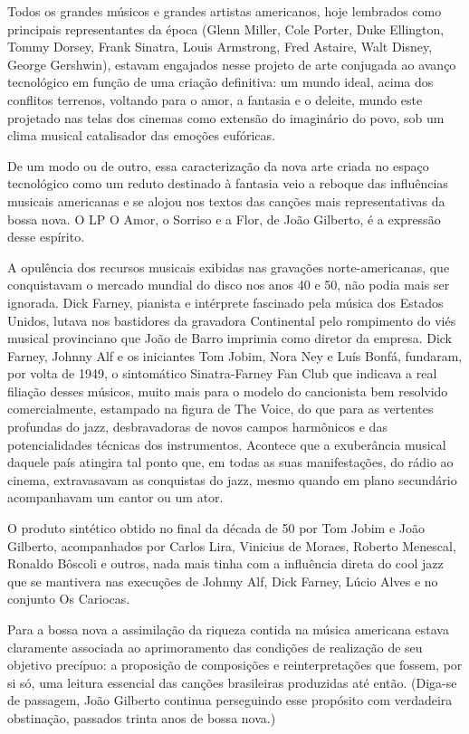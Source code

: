 Todos os grandes músicos e grandes artistas americanos, hoje lembrados
como principais representantes da época (Glenn Miller, Cole Porter, Duke
Ellington, Tommy Dorsey, Frank Sinatra, Louis Armstrong, Fred Astaire,
Walt Disney, George Gershwin), estavam engajados nesse projeto de arte
conjugada ao avanço tecnológico em função de uma criação definitiva: um
mundo ideal, acima dos conflitos terrenos, voltando para o amor, a
fantasia e o deleite, mundo este projetado nas telas dos cinemas como
extensão do imaginário do povo, sob um clima musical catalisador das
emoções eufóricas.~

De um modo ou de outro, essa caracterização da nova arte criada no
espaço tecnológico como um reduto destinado à fantasia veio a reboque
das influências musicais americanas e se alojou nos textos das canções
mais representativas da bossa nova. O LP O Amor, o Sorriso e a Flor, de
João Gilberto, é a expressão desse espírito.~

A opulência dos recursos musicais exibidas nas gravações
norte-americanas, que conquistavam o mercado mundial do disco nos anos
40 e 50, não podia mais ser ignorada. Dick Farney, pianista e intérprete
fascinado pela música dos Estados Unidos, lutava nos bastidores da
gravadora Continental pelo rompimento do viés musical provinciano que
João de Barro imprimia como diretor da empresa. Dick Farney, Johnny Alf
e os iniciantes Tom Jobim, Nora Ney e Luís Bonfá, fundaram, por volta de
1949, o sintomático Sinatra-Farney Fan Club que indicava a real filiação
desses músicos, muito mais para o modelo do cancionista bem resolvido
comercialmente, estampado na figura de The Voice, do que para as
vertentes profundas do jazz, desbravadoras de novos campos harmônicos e
das potencialidades técnicas dos instrumentos. Acontece que a
exuberância musical daquele país atingira tal ponto que, em todas as
suas manifestações, do rádio ao cinema, extravasavam as conquistas do
jazz, mesmo quando em plano secundário acompanhavam um cantor ou um
ator.~

O produto sintético obtido no final da década de 50 por Tom Jobim e João
Gilberto, acompanhados por Carlos Lira, Vinicius de Moraes, Roberto
Menescal, Ronaldo Bôscoli e outros, nada mais tinha com a influência
direta do cool jazz que se mantivera nas execuções de Johnny Alf, Dick
Farney, Lúcio Alves e no conjunto Os Cariocas.

Para a bossa nova a assimilação da riqueza contida na música americana
estava claramente associada ao aprimoramento das condições de realização
de seu objetivo precípuo: a proposição de composições e reinterpretações
que fossem, por si só, uma leitura essencial das canções brasileiras
produzidas até então. (Diga-se de passagem, João Gilberto continua
perseguindo esse propósito com verdadeira obstinação, passados trinta
anos de bossa nova.)

